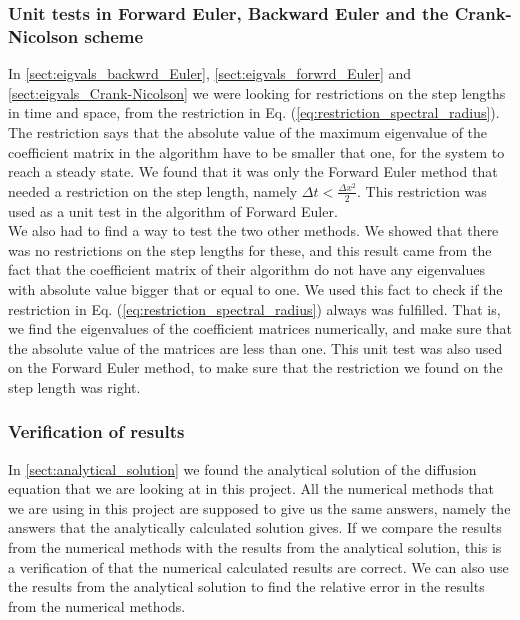 \documentclass[12pt]{article}
\begin{document}
\begin{flushleft}
\subsubsection{Unit tests in Forward Euler, Backward Euler and the Crank-Nicolson scheme}
In \ref{sect:eigvals_backwrd_Euler}, \ref{sect:eigvals_forwrd_Euler} and \ref{sect:eigvals_Crank-Nicolson} we were looking for restrictions on the step lengths in time and space, from the restriction in Eq. (\ref{eq:restriction_spectral_radius}). The restriction says that the absolute value of the maximum eigenvalue of the coefficient matrix in the algorithm have to be smaller that one, for the system to reach a steady state. We found that it was only the Forward Euler method that needed a restriction on the step length, namely $\Delta t < \frac{\Delta x^2}{2}$. This restriction was used as a unit test in the algorithm of Forward Euler.\\
\vspace{5mm}
We also had to find a way to test the two other methods. We showed that there was no restrictions on the step lengths for these, and this result came from the fact that the coefficient matrix of their algorithm do not have any eigenvalues with absolute value bigger that or equal to one. We used this fact to check if the restriction in Eq. (\ref{eq:restriction_spectral_radius}) always was fulfilled. That is, we find the eigenvalues of the coefficient matrices numerically, and make sure that the absolute value of the matrices are less than one. This unit test was also used on the Forward Euler method, to make sure that the restriction we found on the step length was right. 

\subsubsection{Verification of results}
In \ref{sect:analytical_solution} we found the analytical solution of the diffusion equation that we are looking  at in this project. All the numerical methods that we are using in this project are supposed to give us the same answers, namely the answers that the analytically calculated solution gives. If we compare the results from the numerical methods with the results from the analytical solution, this is a verification of that the numerical calculated results are correct. We can also use the results from the analytical solution to find the relative error in the results from the numerical methods.





\end{flushleft}
\end{document}

